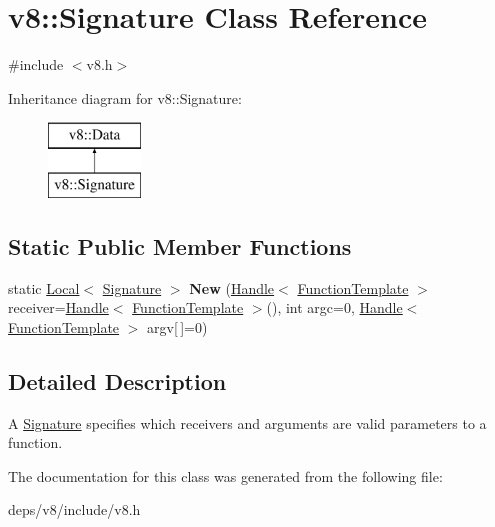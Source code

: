 \hypertarget{classv8_1_1_signature}{}\section{v8\+:\+:Signature Class Reference}
\label{classv8_1_1_signature}


{\ttfamily \#include $<$v8.\+h$>$}

Inheritance diagram for v8\+:\+:Signature\+:\begin{figure}[H]
\begin{center}
\leavevmode
\includegraphics[height=2.000000cm]{classv8_1_1_signature}
\end{center}
\end{figure}
\subsection*{Static Public Member Functions}
\begin{DoxyCompactItemize}
\item 
\hypertarget{classv8_1_1_signature_af7b86faf672247850727b2de1546b71f}{}static \hyperlink{classv8_1_1_local}{Local}$<$ \hyperlink{classv8_1_1_signature}{Signature} $>$ {\bfseries New} (\hyperlink{classv8_1_1_handle}{Handle}$<$ \hyperlink{classv8_1_1_function_template}{Function\+Template} $>$ receiver=\hyperlink{classv8_1_1_handle}{Handle}$<$ \hyperlink{classv8_1_1_function_template}{Function\+Template} $>$(), int argc=0, \hyperlink{classv8_1_1_handle}{Handle}$<$ \hyperlink{classv8_1_1_function_template}{Function\+Template} $>$ argv\mbox{[}$\,$\mbox{]}=0)\label{classv8_1_1_signature_af7b86faf672247850727b2de1546b71f}

\end{DoxyCompactItemize}


\subsection{Detailed Description}
A \hyperlink{classv8_1_1_signature}{Signature} specifies which receivers and arguments are valid parameters to a function. 

The documentation for this class was generated from the following file\+:\begin{DoxyCompactItemize}
\item 
deps/v8/include/v8.\+h\end{DoxyCompactItemize}
